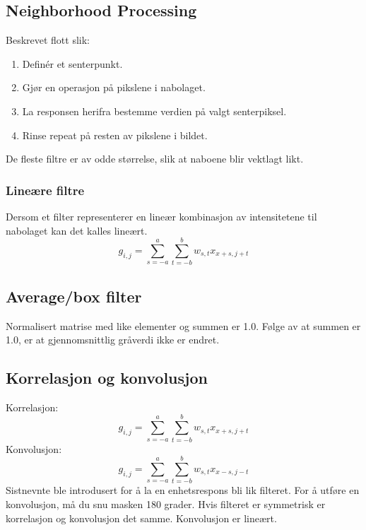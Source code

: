 \subsection{Neighborhood Processing}
Beskrevet flott slik:
\begin{enumerate}
    \item Definér et senterpunkt.
    \item Gjør en operasjon på pikslene i nabolaget.
    \item La responsen herifra bestemme verdien på valgt senterpiksel.
    \item Rinse repeat på resten av pikslene i bildet.
\end{enumerate}
De fleste filtre er av odde størrelse, slik at naboene blir vektlagt likt.

\subsubsection{Lineære filtre}
Dersom et filter representerer en lineær kombinasjon av intensitetene til nabolaget kan det kalles lineært.
\begin{equation}
    g_{i,j} = \sum_{s=-a}^a \sum_{t=-b}^b w_{s,t} x_{x+s, j+t}
\end{equation}

\subsection{Average/box filter}
Normalisert matrise med like elementer og summen er 1.0. Følge av at summen er 1.0, er at gjennomsnittlig gråverdi ikke er endret.

\subsection{Korrelasjon og konvolusjon}
Korrelasjon:
\begin{equation}
    g_{i,j} = \sum_{s=-a}^a \sum_{t=-b}^b w_{s,t} x_{x+s, j+t}
\end{equation}
Konvolusjon:
\begin{equation}
    g_{i,j} = \sum_{s=-a}^a \sum_{t=-b}^b w_{s,t} x_{x-s, j-t}
\end{equation}
Sistnevnte ble introdusert for å la en enhetsrespons bli lik filteret. For å utføre en konvolusjon, må du snu masken 180 grader. Hvis filteret er symmetrisk er korrelasjon og konvolusjon det samme. Konvolusjon er lineært.

